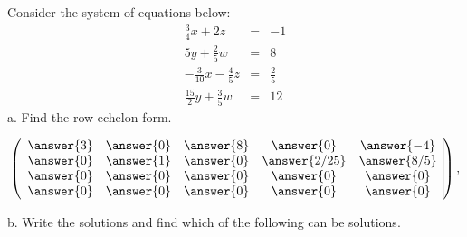 \documentclass{ximera}
\author{Parisa Fatheddin}
\begin{document}
\begin{exercise} Consider the system of equations below:
\begin{eqnarray*}
\frac{3}{4}x+2z&=&-1\\
5y+ \frac{2}{5}w &=& 8\\
-\frac{3}{10} x - \frac{4}{5} z &=& \frac{2}{5}\\
\frac{15}{2}y + \frac{3}{5}w &=& 12
\end{eqnarray*}
a. Find the row-echelon form.\\
\begin{prompt}
\[
\left(\begin{array}{ccccc|c}
  \answer{3} &  \answer{0} & \answer{8} & \answer{0} &\answer{-4} \\
  \answer{0} &  \answer{1} & \answer{0} & \answer{2/25} &\answer{8/5}\\
  \answer{0} &  \answer{0} & \answer{0} & \answer{0} &\answer{0}\\
  \answer{0} &  \answer{0} & \answer{0} & \answer{0} &\answer{0}
\end{array}\right),
\]
\end{prompt}
b. Write the solutions and find which of the following can be solutions.
\begin{multipleChoice}
\\
\\
\\
\\
\\
\\
\end{multipleChoice}
\end{exercise}
\end{document}
